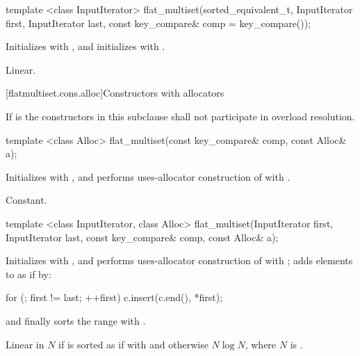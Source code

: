 \begin{codeblock}
\begin{codeblock}
\begin{codeblock}
\begin{addedblock}
%
\begin{itemdecl}
template <class InputIterator>
  flat_multiset(sorted_equivalent_t, InputIterator first, InputIterator last,
                const key_compare& comp = key_compare());
\end{itemdecl}

\begin{itemdescr}
\pnum
\effects Initializes  with , and initializes
 with .

\pnum
\complexity
Linear.
\end{itemdescr}

[flatmultiset.cons.alloc]{Constructors with allocators}

\pnum
If  is 
the constructors in this subclause shall not participate in overload resolution.

%
\begin{itemdecl}
template <class Alloc>
  flat_multiset(const key_compare& comp, const Alloc& a);
\end{itemdecl}

\begin{itemdescr}
\pnum
\effects Initializes  with , and performs
uses-allocator construction of
 with .

\pnum
\complexity
Constant.
\end{itemdescr}

%
\begin{itemdecl}
template <class InputIterator, class Alloc>
  flat_multiset(InputIterator first, InputIterator last,
                const key_compare& comp, const Alloc& a);
\end{itemdecl}

\begin{itemdescr}
\pnum
\effects Initializes  with , and performs
uses-allocator construction of 
with ; adds elements to  as if by:
\begin{codeblock}
for (; first != last; ++first) {
  c.insert(c.end(), *first);
}
\end{codeblock}
and finally sorts the range  with .

\pnum
\complexity
Linear in $N$ if  is sorted as if with  and
otherwise $N \log N$, where $N$ is .
\end{itemdescr}


\end{addedblock}
\end{codeblock}
\end{codeblock}
\end{codeblock}
